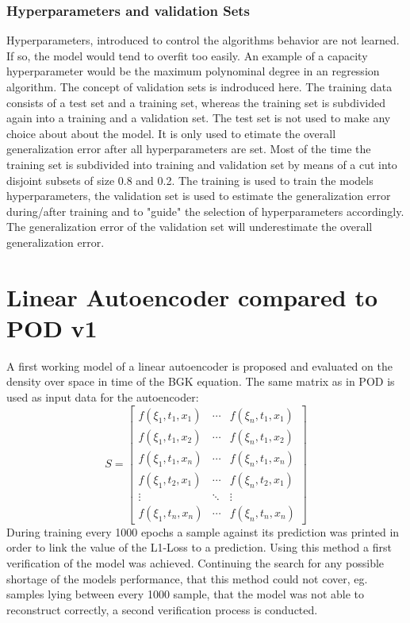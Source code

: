 \documentclass[12pt, a4paper]{article}
\begin{document}
	\subsubsection{Hyperparameters and validation Sets}
	Hyperparameters, introduced to control the algorithms behavior are not learned. If so, the model would tend to overfit too easily. An example of a capacity hyperparameter would be the maximum polynominal degree in an regression algorithm. The concept of validation sets is indroduced here. The training data consists of a test set and a training set, whereas the training set is subdivided again into a training and a validation set. The test set is not used to make any choice about about the model. It is only used to etimate the overall generalization error after all hyperparameters are set. Most of the time the training set is subdivided into training and validation set by means of a cut into disjoint subsets of size 0.8 and 0.2. The training is used to train the models hyperparameters, the validation set is used to estimate the generalization error during/after training and to "guide" the selection of hyperparameters accordingly. The generalization error of the validation set will underestimate the overall generalization error.
\section{Linear Autoencoder compared to POD v1}
A first working model of a linear autoencoder is proposed and evaluated on the density over space in time of the BGK equation. The same matrix as in POD is used as input data for the autoencoder:
		\[S = \begin{bmatrix}
	f(\xi_1,t_1,x_1)&\cdots &f(\xi_n,t_1,x_1) \\
	f(\xi_1,t_1,x_2)&\cdots &f(\xi_n,t_1,x_2) \\
	f(\xi_1,t_1,x_n)&\cdots &f(\xi_n,t_1,x_n)\\
	f(\xi_1,t_2,x_1)&\cdots &f(\xi_n,t_2,x_1)\\
	\vdots & \ddots & \vdots\\
	f(\xi_1,t_n,x_n)&\cdots &f(\xi_n,t_n,x_n)
	\end{bmatrix}\]
During training every 1000 epochs a sample against its prediction was printed in order to link the value of the L1-Loss to a prediction. Using this method a first verification of the model was achieved. Continuing the search for any possible shortage of the models performance, that this method could not cover, eg. samples lying between every 1000 sample, that the model was not able to reconstruct correctly, a second verification process is conducted. 
\end{document}
